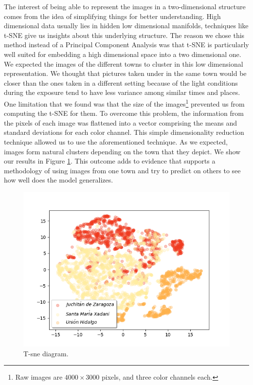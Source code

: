 The interest of being able to represent the images in a two-dimensional structure comes from the idea of simplifying things for better understanding. High dimensional data usually lies in hidden low dimensional manifolds, techniques like t-SNE give us insights about this underlying structure. The reason we chose this method instead of a Principal Component Analysis was that t-SNE is particularly well suited for embedding a high dimensional space into a two dimensional one.\\

We expected the images of the different towns to cluster in this low dimensional representation. We thought that pictures taken under in the same town would be closer than the ones taken in a different setting because of the light conditions during the exposure tend to have less variance among similar times and places.\\

One limitation that we found was that the size of the images\footnote{Raw images are $4000\times3000$ pixels, and three color channels each.} prevented us from computing the t-SNE for them. To overcome this problem, the information from the pixels of each image was flattened into a vector comprising the means and standard deviations for each color channel. This simple dimensionality reduction technique allowed us to use the aforementioned technique. As we expected, images form natural clusters depending on the town that they depict. We show our results in Figure \ref{fig:tsne}. This outcome adds to evidence that supports a methodology of using images from one town and try to predict on others to see how well does the model generalizes.\\

\begin{figure}[!h]
  \centering
  \includegraphics[width=1\textwidth]{images/t-sne-bis.png}
  \caption{T-sne diagram.}
  \label{fig:tsne}
\end{figure}

